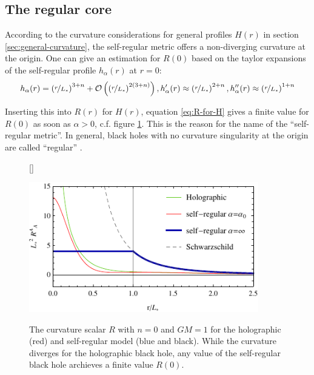 \documentclass[12pt,a4paper]{report}
\numberwithin{equation}{chapter}
\begin{document}
\clearpage
\subsection{The regular core}\label{sec:regular-core}
According to the curvature considerations for general profiles $H(r)$ in section \ref{sec:general-curvature}, the self-regular metric offers a non-diverging curvature at the origin. 
%
One can give an estimation for $R(0)$ based on the taylor expansions of the self-regular profile $h_\alpha(r)$ at $r=0$:
\begin{equation}
h_\alpha(r) =
\left( \nicefrac r{L_*} \right)^{3+n} + {\cal O}\left( \left( \nicefrac r{L_*} \right)^{2 (3+n)}\right), h_\alpha'(r) \approx \left( \nicefrac r{L_*} \right)^{2+n}, h_\alpha''(r) \approx \left( \nicefrac r{L_*} \right)^{1+n}
\end{equation}

Inserting this into $R(r)$ for $H(r)$, equation \eqref{eq:R-for-H} gives a finite value for $R(0)$ as soon as $\alpha>0$, c.f. figure \ref{fig:Ricci-H}. This is the reason for the name of the ``self-regular metric''. In general, black holes with no curvature singularity at the origin are called ``regular'' \cite{Ansoldi2008,Hayward2005gi}.

\begin{figure}[h!]
[\FBwidth]{%
\caption[Plot of the curvature scalar]{The curvature scalar $R$ with $n=0$ and $GM=1$ for the holo\-graphic (red) and self-regular model (blue and black). While the curvature diverges for the holographic black hole, any value of the self-regular black hole archieves a finite value $R(0)$.}\label{fig:Ricci-H}
}{\includegraphics[width=10cm]{figures/ricci-scalar.pdf}}
\end{figure}
\end{document}
